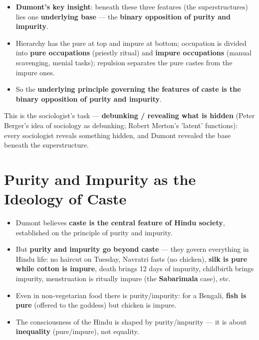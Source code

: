 \begin{KeyConcept}
\begin{itemize}
\item \textbf{Dumont's key insight}: beneath these three features (the superstructures) lies one \textbf{underlying base} --- the \textbf{binary opposition of purity and impurity}.
\item Hierarchy has the pure at top and impure at bottom; occupation is divided into \textbf{pure occupations} (priestly ritual) and \textbf{impure occupations} (manual scavenging, menial tasks); repulsion separates the pure castes from the impure ones.
\item So the \textbf{underlying principle governing the features of caste is the binary opposition of purity and impurity}.
\end{itemize}
\end{KeyConcept}

\begin{KeyConcept}
This is the sociologist's task --- \textbf{debunking / revealing what is hidden} (Peter Berger's idea of sociology as debunking; Robert Merton's 'latent' functions): every sociologist reveals something hidden, and Dumont revealed the base beneath the superstructure.
\end{KeyConcept}

\section{Purity and Impurity as the Ideology of Caste}

\begin{KeyConcept}
\begin{itemize}
\item Dumont believes \textbf{caste is the central feature of Hindu society}, established on the principle of purity and impurity.
\item But \textbf{purity and impurity go beyond caste} --- they govern everything in Hindu life: no haircut on Tuesday, Navratri fasts (no chicken), \textbf{silk is pure while cotton is impure}, death brings 12 days of impurity, childbirth brings impurity, menstruation is ritually impure (the \textbf{Sabarimala} case), etc.
\item Even in non-vegetarian food there is purity/impurity: for a Bengali, \textbf{fish is pure} (offered to the goddess) but chicken is impure.
\item The consciousness of the Hindu is shaped by purity/impurity --- it is about \textbf{inequality} (pure/impure), not equality.
\end{itemize}
\end{KeyConcept}

